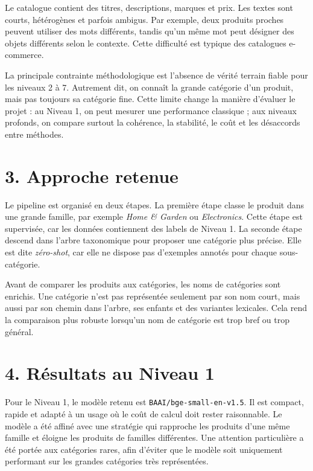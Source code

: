 \documentclass[11pt,a4paper]{article}
\begin{document}
Le catalogue contient des titres, descriptions, marques et prix. Les textes sont courts, hétérogènes et parfois ambigus. Par exemple, deux produits proches peuvent utiliser des mots différents, tandis qu'un même mot peut désigner des objets différents selon le contexte. Cette difficulté est typique des catalogues e-commerce.

La principale contrainte méthodologique est l'absence de vérité terrain fiable pour les niveaux 2 à 7. Autrement dit, on connaît la grande catégorie d'un produit, mais pas toujours sa catégorie fine. Cette limite change la manière d'évaluer le projet : au Niveau 1, on peut mesurer une performance classique ; aux niveaux profonds, on compare surtout la cohérence, la stabilité, le coût et les désaccords entre méthodes.

\section*{3. Approche retenue}

Le pipeline est organisé en deux étapes. La première étape classe le produit dans une grande famille, par exemple \emph{Home \& Garden} ou \emph{Electronics}. Cette étape est supervisée, car les données contiennent des labels de Niveau 1. La seconde étape descend dans l'arbre taxonomique pour proposer une catégorie plus précise. Elle est dite \emph{zéro-shot}, car elle ne dispose pas d'exemples annotés pour chaque sous-catégorie.

Avant de comparer les produits aux catégories, les noms de catégories sont enrichis. Une catégorie n'est pas représentée seulement par son nom court, mais aussi par son chemin dans l'arbre, ses enfants et des variantes lexicales. Cela rend la comparaison plus robuste lorsqu'un nom de catégorie est trop bref ou trop général.

\newpage

\section*{4. Résultats au Niveau 1}

Pour le Niveau 1, le modèle retenu est \texttt{BAAI/bge-small-en-v1.5}. Il est compact, rapide et adapté à un usage où le coût de calcul doit rester raisonnable. Le modèle a été affiné avec une stratégie qui rapproche les produits d'une même famille et éloigne les produits de familles différentes. Une attention particulière a été portée aux catégories rares, afin d'éviter que le modèle soit uniquement performant sur les grandes catégories très représentées.
\end{document}
